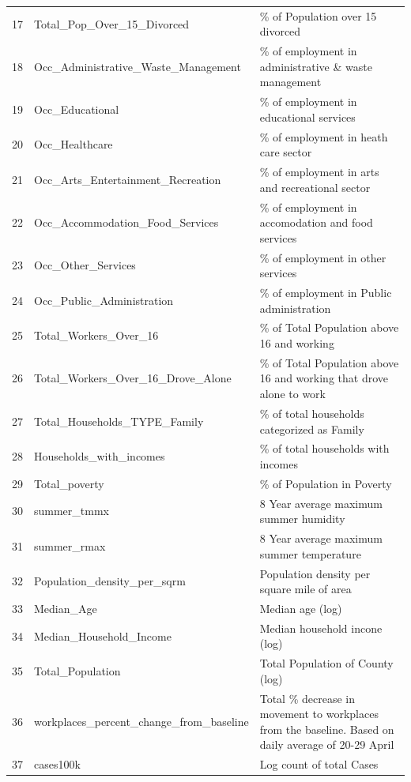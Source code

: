 \documentclass[
]{article}
\begin{document}
\begin{table}[ht]
{\begin{tabular}{rll}
  17 & Total\_Pop\_Over\_15\_Divorced & \% of Population over 15 divorced \\ 
  18 & Occ\_Administrative\_Waste\_Management & \% of employment in administrative \& waste management \\ 
  19 & Occ\_Educational & \% of employment in educational services \\ 
  20 & Occ\_Healthcare & \% of employment in heath care sector \\ 
  21 & Occ\_Arts\_Entertainment\_Recreation & \% of employment in arts and recreational sector \\ 
  22 & Occ\_Accommodation\_Food\_Services & \% of employment in accomodation and food services \\ 
  23 & Occ\_Other\_Services & \% of employment in other services \\ 
  24 & Occ\_Public\_Administration & \% of employment in Public administration \\ 
  25 & Total\_Workers\_Over\_16 & \% of Total Population above 16 and working \\ 
  26 & Total\_Workers\_Over\_16\_Drove\_Alone & \% of Total Population above 16 and working that drove alone to work \\ 
  27 & Total\_Households\_TYPE\_Family & \% of total households categorized as Family \\ 
  28 & Households\_with\_incomes & \% of total households with incomes \\ 
  29 & Total\_poverty & \% of Population in Poverty \\ 
  30 & summer\_tmmx & 8 Year average maximum summer humidity \\ 
  31 & summer\_rmax & 8 Year average maximum summer temperature \\ 
  32 & Population\_density\_per\_sqrm & Population density per square mile of area \\ 
  33 & Median\_Age & Median age (log) \\ 
  34 & Median\_Household\_Income & Median household incone (log) \\ 
  35 & Total\_Population & Total Population of County (log) \\ 
  36 & workplaces\_percent\_change\_from\_baseline & Total \% decrease in movement to workplaces from the baseline. Based on daily average of 20-29 April  \\ 
  37 & cases100k & Log count of total Cases \\ 
   \hline
\end{tabular}}
\end{table}
\end{document}
